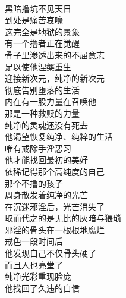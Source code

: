 \begin{poem}[光芒万丈的戒者]
    \begin{multicols}{2}
        \begin{center}~\\
            黑暗撸坑不见天日 \\ 到处是痛苦哀嚎 \\ 这完全是地狱的景象 \\ 有一个撸者正在觉醒 \\ 骨子里渗透出来的不屈意志 \\ 足以使他涅槃重生 \\ 迎接新次元，纯净的新次元 \\ 彻底告别堕落的生活 \\ 内在有一股力量在召唤他 \\ 那是一种救赎的力量 \\ 纯净的灵魂还没有死去 \\ 他渴望恢复纯净、纯粹的生活 \\ 唯有戒除手淫恶习 \\ 他才能找回最初的美好 \\ 依稀记得那个高纯度的自己 \\ 那个不撸的孩子 \\ 周身散发着纯净的光芒 \\ 在沉迷邪淫后，光芒消失了 \\ 取而代之的是无比的灰暗与猥琐 \\ 邪淫的骨头在一根根地腐烂 \\ 戒色一段时间后 \\ 他发现自己不仅骨头硬了 \\ 而且人也亮堂了 \\ 纯净光彩重现脸庞 \\ 他找回了久违的自信
        \end{center}
    \end{multicols}
\end{poem}

